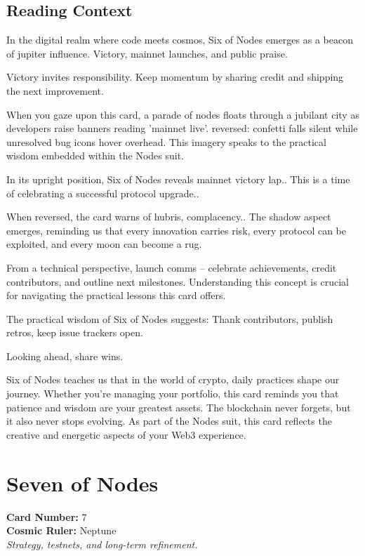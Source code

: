 \documentclass[11pt,oneside]{book}
\begin{document}
\begin{minipage}[t]{0.55\textwidth}
  \subsection*{Reading Context}
  In the digital realm where code meets cosmos, Six of Nodes emerges as a beacon of jupiter influence. Victory, mainnet launches, and public praise.

  Victory invites responsibility. Keep momentum by sharing credit and shipping the next improvement.

  When you gaze upon this card, a parade of nodes floats through a jubilant city as developers raise banners reading 'mainnet live'. reversed: confetti falls silent while unresolved bug icons hover overhead. This imagery speaks to the practical wisdom embedded within the Nodes suit.

  In its upright position, Six of Nodes reveals mainnet victory lap.. This is a time of celebrating a successful protocol upgrade..

  When reversed, the card warns of hubris, complacency.. The shadow aspect emerges, reminding us that every innovation carries risk, every protocol can be exploited, and every moon can become a rug.

  From a technical perspective, launch comms – celebrate achievements, credit contributors, and outline next milestones. Understanding this concept is crucial for navigating the practical lessons this card offers.

  The practical wisdom of Six of Nodes suggests: Thank contributors, publish retros, keep issue trackers open.

  Looking ahead, share wins.

  Six of Nodes teaches us that in the world of crypto, daily practices shape our journey. Whether you're managing your portfolio, this card reminds you that patience and wisdom are your greatest assets. The blockchain never forgets, but it also never stops evolving. As part of the Nodes suit, this card reflects the creative and energetic aspects of your Web3 experience.

\end{minipage}

\newpage
\section*{Seven of Nodes}

\begin{minipage}[t]{0.55\textwidth}
  \vspace{0pt}
  \textbf{Card Number:} 7\\  \textbf{Cosmic Ruler:} Neptune\\  \textit{Strategy, testnets, and long-term refinement.}
\end{minipage}
\end{document}
